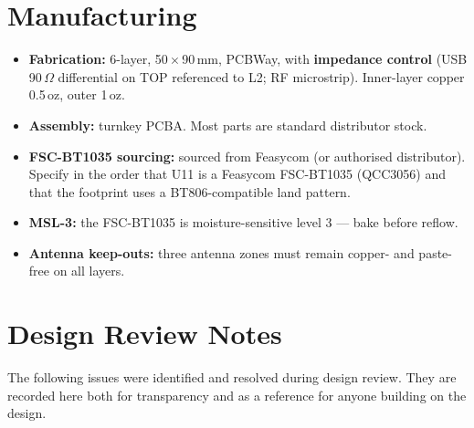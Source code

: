 \documentclass[11pt,a4paper]{report}
\begin{document}
\chapter{Manufacturing}
\begin{itemize}[leftmargin=1.4em,itemsep=3pt]
  \item \textbf{Fabrication:} 6-layer, 50\,$\times$\,90\,mm, PCBWay, with
        \textbf{impedance control} (USB 90\,$\Omega$ differential on TOP referenced to
        L2; RF microstrip). Inner-layer copper 0.5\,oz, outer 1\,oz.
  \item \textbf{Assembly:} turnkey PCBA. Most parts are standard distributor stock.
  \item \textbf{FSC-BT1035 sourcing:} sourced from Feasycom (or authorised
        distributor). Specify in the order that U11 is a Feasycom FSC-BT1035 (QCC3056)
        and that the footprint uses a BT806-compatible land pattern.
  \item \textbf{MSL-3:} the FSC-BT1035 is moisture-sensitive level 3 --- bake before
        reflow.
  \item \textbf{Antenna keep-outs:} three antenna zones must remain copper- and
        paste-free on all layers.
\end{itemize}

\appendix
\chapter{Design Review Notes}
The following issues were identified and resolved during design review. They are
recorded here both for transparency and as a reference for anyone building on the
design.
\end{document}

